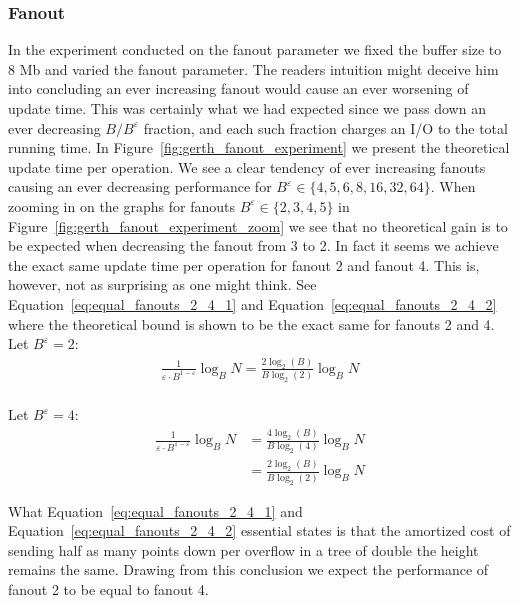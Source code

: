 \documentclass[twoside,11pt,openright]{report}
\def \epsilon {\varepsilon}
\begin{document}
\clearpage

\subsubsection*{Fanout}
In the experiment conducted on the fanout parameter we fixed the buffer size to 8 Mb and varied the fanout parameter. The readers intuition might deceive him into concluding an ever increasing fanout would cause an ever worsening of update time. This was certainly what we had expected since we pass down an ever decreasing $B / B^\epsilon$ fraction, and each such fraction charges an I/O to the total running time. In Figure~\ref{fig:gerth_fanout_experiment} we present the theoretical update time per operation. We see a clear tendency of ever increasing fanouts causing an ever decreasing performance for $B^\epsilon \in \{4, 5, 6, 8, 16, 32, 64 \}$. When zooming in on the graphs for fanouts $B^\epsilon \in \{2, 3, 4, 5\}$ in Figure~\ref{fig:gerth_fanout_experiment_zoom} we see that no theoretical gain is to be expected when decreasing the fanout from 3 to 2. In fact it seems we achieve the exact same update time per operation for fanout 2 and fanout 4. This is, however, not as surprising as one might think. See Equation~\ref{eq:equal_fanouts_2_4_1} and Equation~\ref{eq:equal_fanouts_2_4_2} where the theoretical bound is shown to be the exact same for fanouts 2 and 4.\\

Let $B^\epsilon = 2$:
\begin{equation} \label{eq:equal_fanouts_2_4_1}
	\begin{split}
		\frac{1}{\epsilon \cdot B^{1-\epsilon}}\log_B N = \frac{2\log_2(B)}{B\log_2(2)}\log_B N \\
	\end{split}
\end{equation}

Let $B^\epsilon = 4$:
\begin{equation} \label{eq:equal_fanouts_2_4_2}
	\begin{split}
		\frac{1}{\epsilon \cdot B^{1-\epsilon}}\log_B N & = \frac{4\log_2(B)}{B\log_2(4)}\log_B N \\
		& = \frac{2\log_2(B)}{B\log_2(2)}\log_B N
	\end{split}
\end{equation}

What Equation~\ref{eq:equal_fanouts_2_4_1} and Equation~\ref{eq:equal_fanouts_2_4_2} essential states is that the amortized cost of sending half as many points down per overflow in a tree of double the height remains the same. Drawing from this conclusion we expect the performance of fanout 2 to be equal to fanout 4.
\end{document}
